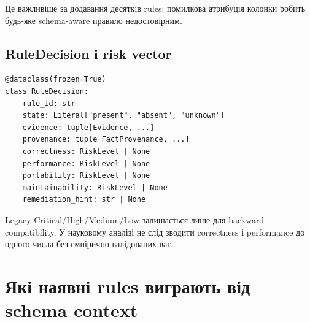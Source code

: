 \documentclass[11pt,a4paper]{article}
\begin{document}
Це важливіше за додавання десятків rules: помилкова атрибуція колонки робить будь-яке
schema-aware правило недостовірним.

\subsection{RuleDecision і risk vector}

\begin{lstlisting}[style=pythonstyle]
@dataclass(frozen=True)
class RuleDecision:
    rule_id: str
    state: Literal["present", "absent", "unknown"]
    evidence: tuple[Evidence, ...]
    provenance: tuple[FactProvenance, ...]
    correctness: RiskLevel | None
    performance: RiskLevel | None
    portability: RiskLevel | None
    maintainability: RiskLevel | None
    remediation_hint: str | None
\end{lstlisting}

Legacy Critical/High/Medium/Low залишається лише для backward compatibility. У
науковому аналізі не слід зводити correctness і performance до одного числа без
емпірично валідованих ваг.

\section{Які наявні rules виграють від schema context}
\end{document}
